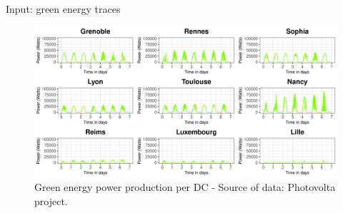 \documentclass[Ligatures=TeX,table,svgnames,usetotalslideindicator,compress,10pt,aspectratio=169]{beamer}
\begin{document}
\begin{frame}{Input: green energy traces}  
  \begin{figure}[!h]
    \centering
    \includegraphics[width=\textwidth]{images/green_pow_production.png}
    \caption{Green energy power production per DC - Source of data:
      Photovolta project.}
  \end{figure}
\end{frame}
\end{document}

